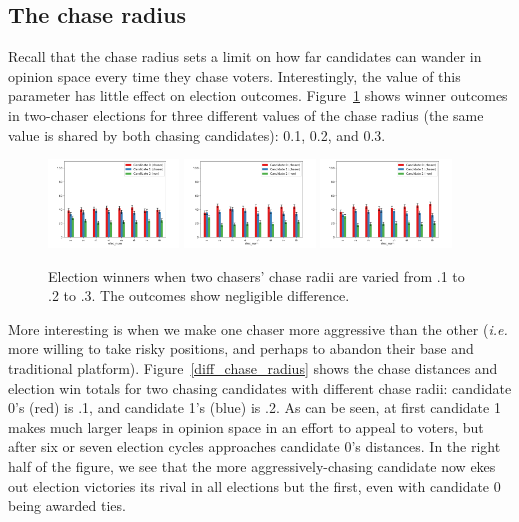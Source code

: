 \subsection{The chase radius}

Recall that the chase radius sets a limit on how far candidates can wander in
opinion space every time they chase voters. Interestingly, the value of this
parameter has little effect on election outcomes. Figure~\ref{chase_radius}
shows winner outcomes in two-chaser elections for three different values of the
chase radius (the same value is shared by both chasing candidates): 0.1, 0.2,
and 0.3.

\begin{figure}[ht]
\centering
\includegraphics[width=0.31\textwidth]{assets/chase_radius_.1_winners.png}
\includegraphics[width=0.31\textwidth]{assets/chase_radius_.2_winners.png}
\includegraphics[width=0.31\textwidth]{assets/chase_radius_.3_winners.png}
\caption{Election winners when two chasers' chase radii are varied from .1 to
.2 to .3. The outcomes show negligible difference.}
\label{chase_radius}
\end{figure}

More interesting is when we make one chaser more aggressive than the other
(\textit{i.e.} more willing to take risky positions, and perhaps to abandon
their base and traditional platform). Figure~\ref{diff_chase_radius} shows the
chase distances and election win totals for two chasing candidates with
different chase radii: candidate 0's (red) is .1, and candidate 1's (blue) is
.2. As can be seen, at first candidate 1 makes much larger leaps in opinion
space in an effort to appeal to voters, but after six or seven election cycles
approaches candidate 0's distances. In the right half of the figure, we see
that the more aggressively-chasing candidate now ekes out election victories
its rival in all elections but the first, even with candidate 0 being awarded
ties.

